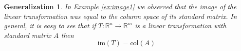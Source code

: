 \documentclass{ximera}
\newcommand{\RR}{\mathbb{R}}
\newtheorem{general}{Generalization}
\begin{document}
\begin{general}
In Example \ref{ex:image1} we observed that the image of the linear transformation was equal to the column space of its standard matrix.  In general, it is easy to see that if $T:\RR^n\rightarrow \RR^m$ is a linear transformation with standard matrix $A$ then
$$\text{im}(T)=\text{col}(A)$$





\end{general}
\end{document}
